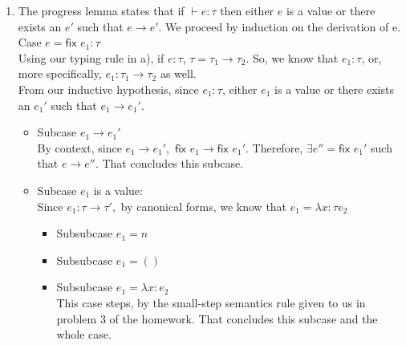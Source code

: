 \documentclass[10pt, oneside]{article}
\begin{document}
\begin{enumerate}
\begin{enumerate}
		\item The progress lemma states that if $\vdash e : \tau $ then either $e$ is a value or there exists an $e'$ such that $ e \rightarrow e'.$
		We proceed by induction on the derivation of e.\\
					
		{\sc Case} $e =  \textsf{fix } e_1: \tau$\\
		
		Using our typing rule in a), if $e: \tau$, $\tau =  \tau_1 \rightarrow \tau_2.$ So, we know that $e_1: \tau$, or, more specifically, $e_1: \tau_1 \rightarrow \tau_2$ as well.\\
		
		From our inductive hypothesis, since  $e_1: \tau$,  either $e_1$ is a value or there exists an $e_1'$ such that $e_1 \rightarrow e_1'.$\\
		
		\begin{itemize}
		\item {\sc Subcase} $e_1 \rightarrow e_1'$ \\
		
		By {\sc context}, since $e_1 \rightarrow e_1',$ $\textsf{fix } e_1 \rightarrow \textsf{fix }e_1'.$ Therefore, $\exists e'' = \textsf{fix }e_1'$ such that $e \rightarrow e''.$ That concludes this subcase. \checkmark \checkmark \\
		
		\item {\sc Subcase} $e_1$ is a value:\\
		
		Since $e_1: \tau \rightarrow \tau',$ by canonical forms, we know that $e_1 = \lambda x:\tau e_2$\\
		
		
		
		
		
		
		
		\begin{itemize}
		\item {\sc Subsubcase} $e_1 = n$\\ 
		
		\item {\sc Subsubcase} $e_1 = ()$\\  
		
		\item {\sc Subsubcase} $e_1 = \lambda x: e_2$\\
		This case steps, by the small-step semantics rule given to us in problem 3 of the homework. That concludes this subcase and the whole case.\\
		\end{itemize}
		\end{itemize}


\end{enumerate}
\end{enumerate}
\end{document}

